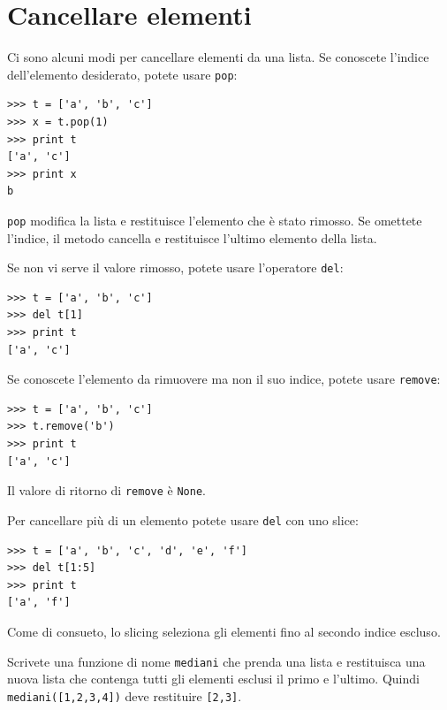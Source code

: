 \documentclass[10pt]{book}
\begin{document}
\section{Cancellare elementi}

Ci sono alcuni modi per cancellare elementi da una lista. Se conoscete l'indice dell'elemento desiderato, potete usare
{\tt pop}:

\begin{verbatim}
>>> t = ['a', 'b', 'c']
>>> x = t.pop(1)
>>> print t
['a', 'c']
>>> print x
b
\end{verbatim}
%
{\tt pop} modifica la lista e restituisce l'elemento che è stato rimosso. Se omettete l'indice, il metodo cancella e restituisce l'ultimo elemento della lista.

Se non vi serve il valore rimosso, potete usare l'operatore {\tt del}:

\begin{verbatim}
>>> t = ['a', 'b', 'c']
>>> del t[1]
>>> print t
['a', 'c']
\end{verbatim}
%

Se conoscete l'elemento da rimuovere ma non il suo indice, potete usare {\tt remove}:

\begin{verbatim}
>>> t = ['a', 'b', 'c']
>>> t.remove('b')
>>> print t
['a', 'c']
\end{verbatim}
%
Il valore di ritorno di {\tt remove} è {\tt None}.

Per cancellare più di un elemento potete usare {\tt del} con uno slice:

\begin{verbatim}
>>> t = ['a', 'b', 'c', 'd', 'e', 'f']
>>> del t[1:5]
>>> print t
['a', 'f']
\end{verbatim}
%
Come di consueto, lo slicing seleziona gli elementi fino al secondo indice escluso.

\vspace{0.2in}
\begin{exercise}

Scrivete una funzione di nome \verb"mediani" che prenda una lista e restituisca una nuova lista che contenga tutti gli elementi esclusi il primo e l'ultimo.  Quindi \verb"mediani([1,2,3,4])" deve restituire \verb"[2,3]".

\end{exercise}
\end{document}
